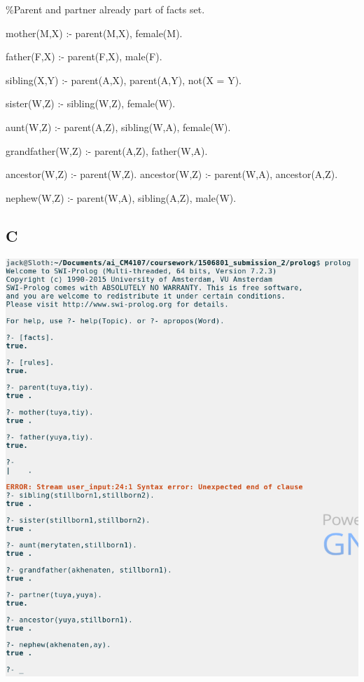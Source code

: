\documentclass{article}
\begin{document}
\%Parent and partner already part of facts set.

mother(M,X) :- parent(M,X), female(M).

father(F,X) :- parent(F,X), male(F).

sibling(X,Y) :- parent(A,X), parent(A,Y), not(X = Y).

sister(W,Z) :- sibling(W,Z), female(W).

aunt(W,Z) :- parent(A,Z), sibling(W,A), female(W).

grandfather(W,Z) :- parent(A,Z), father(W,A).

ancestor(W,Z) :- parent(W,Z).
ancestor(W,Z) :- parent(W,A), ancestor(A,Z).

nephew(W,Z) :- parent(W,A), sibling(A,Z), male(W).

\newpage
\subsection*{C}

\includegraphics[scale=0.5]{testing}
\end{document}
